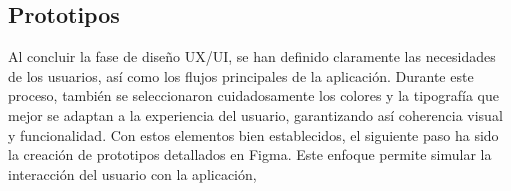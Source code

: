 
\subsection{Prototipos}

Al concluir la fase de diseño UX/UI, se han definido claramente las necesidades de los usuarios, así como los flujos principales de la aplicación. Durante este proceso, también se seleccionaron cuidadosamente los colores y la tipografía que mejor se adaptan a la experiencia del usuario, garantizando así coherencia visual y funcionalidad. Con estos elementos bien establecidos, el siguiente paso ha sido la creación de prototipos detallados en Figma. Este enfoque permite simular la interacción del usuario con la aplicación, 


